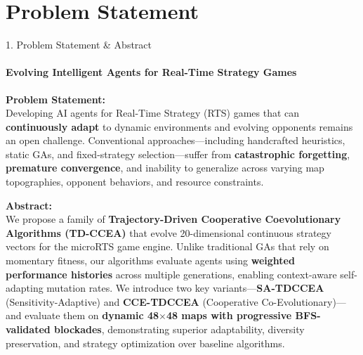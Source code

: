 \documentclass[aspectratio=169, 11pt]{beamer}
\begin{document}
\section{Problem Statement}
\begin{frame}{1. Problem Statement \& Abstract}
    \framesubtitle{Evolving Intelligent Agents for Real-Time Strategy Games}

    \textbf{\textcolor{amritaMaroon}{Problem Statement:}} \\[0.15cm]
    Developing AI agents for Real-Time Strategy (RTS) games that can \textbf{continuously adapt} to dynamic environments and evolving opponents remains an open challenge. Conventional approaches---including handcrafted heuristics, static GAs, and fixed-strategy selection---suffer from \textbf{catastrophic forgetting}, \textbf{premature convergence}, and inability to generalize across varying map topographies, opponent behaviors, and resource constraints.

    \vspace{0.3cm}
    \textbf{\textcolor{amritaMaroon}{Abstract:}} \\[0.15cm]
    We propose a family of \textbf{Trajectory-Driven Cooperative Coevolutionary Algorithms (TD-CCEA)} that evolve 20-dimensional continuous strategy vectors for the microRTS game engine. Unlike traditional GAs that rely on momentary fitness, our algorithms evaluate agents using \textbf{weighted performance histories} across multiple generations, enabling context-aware self-adapting mutation rates. We introduce two key variants---\textbf{SA-TDCCEA} (Sensitivity-Adaptive) and \textbf{CCE-TDCCEA} (Cooperative Co-Evolutionary)---and evaluate them on \textbf{dynamic 48$\times$48 maps with progressive BFS-validated blockades}, demonstrating superior adaptability, diversity preservation, and strategy optimization over baseline algorithms.
\end{frame}

\end{document}
